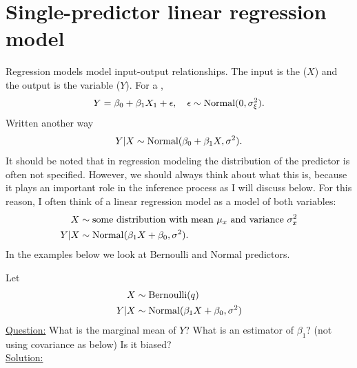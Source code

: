 \section{Single-predictor linear regression model}
Regression models model input-output relationships. The input is the  ($X$) and the output is the  variable ($Y$). For a  , 
\begin{align*}
Y = \beta_0 + \beta_1 X_1 + \epsilon,\quad \epsilon \sim {\rm Normal}(0,\sigma_{\xi}^2).
\end{align*}
Written another way
\begin{equation}
Y|X \sim {\rm Normal}(\beta_0 + \beta_1 X,\sigma^2). 
\end{equation}
It should be noted that in regression modeling the distribution of the predictor is often not specified. However, we should always think about what this is, because it plays an important role in the inference process as I will discuss below. For this reason, I often think of a linear regression model as a model of both variables:
\begin{align}
\begin{split}\label{eq:linreg}
X &\sim \text{some distribution with mean $\mu_x$ and variance $\sigma_x^2$}\\
Y|X &\sim {\rm Normal}(\beta_1X + \beta_0,\sigma^2). 
\end{split}
\end{align}
In the examples below we look at Bernoulli and Normal predictors. 
 

 \begin{example}\label{ex:zerothreg}
 Let
\begin{align*}
X &\sim {\rm Bernoulli}(q)\\
Y|X &\sim {\rm Normal}(\beta_1X + \beta_0,\sigma^2)
\end{align*} \noindent
\underline{Question:} What is the marginal mean of $Y$? What is an estimator of $\beta_1$? (not using covariance as below)  Is it biased? \\


 \noindent
\underline{Solution:} 


 \end{example}

